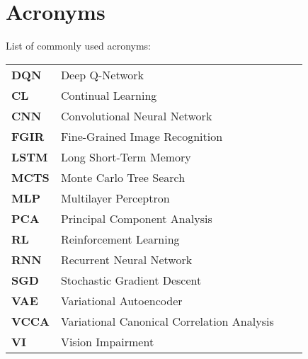 
\chapter{Acronyms}
\label{chap:acronyms}

List of commonly used acronyms: \\

\begin{tabular}{llll}
	\textbf{DQN}		& 	Deep Q-Network \\
	\textbf{CL}			& 	Continual Learning \\
	\textbf{CNN}		& 	Convolutional Neural Network \\
	\textbf{FGIR}		& 	Fine-Grained Image Recognition \\
	\textbf{LSTM}       &   Long Short-Term Memory \\
	\textbf{MCTS}       &   Monte Carlo Tree Search \\
	\textbf{MLP}        &   Multilayer Perceptron \\
	\textbf{PCA}		& 	Principal Component Analysis \\
	\textbf{RL}			& 	Reinforcement Learning \\
	\textbf{RNN}		& 	Recurrent Neural Network \\
	\textbf{SGD}		& 	Stochastic Gradient Descent \\
	\textbf{VAE}		&	Variational Autoencoder \\
	\textbf{VCCA}		&	Variational Canonical Correlation Analysis \\
	\textbf{VI} 		&	Vision Impairment \\
\end{tabular}